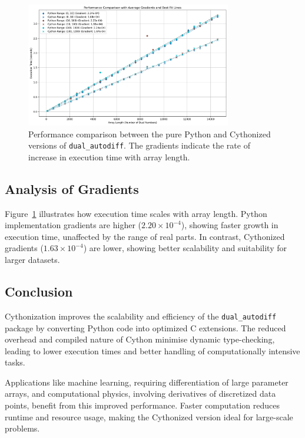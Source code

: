 \documentclass[a4paper,12pt]{article}
\begin{document}
\begin{figure}[h!]
    \centering
    \includegraphics[width=0.8\textwidth]{performance_comparison.png}
    \caption{Performance comparison between the pure Python and Cythonized versions of \texttt{dual\_autodiff}. The gradients indicate the rate of increase in execution time with array length.}
    \label{fig:performance_comparison}
\end{figure}

\subsection{Analysis of Gradients}
Figure~\ref{fig:performance_comparison} illustrates how execution time scales with array length. Python implementation gradients are higher (\(2.20 \times 10^{-4}\)), showing faster growth in execution time, unaffected by the range of real parts. In contrast, Cythonized gradients (\(1.63 \times 10^{-4}\)) are lower, showing better scalability and suitability for larger datasets.

\subsection{Conclusion}
Cythonization improves the scalability and efficiency of the \texttt{dual\_autodiff} package by converting Python code into optimized C extensions. The reduced overhead and compiled nature of Cython minimise dynamic type-checking, leading to lower execution times and better handling of computationally intensive tasks.

Applications like machine learning, requiring differentiation of large parameter arrays, and computational physics, involving derivatives of discretized data points, benefit from this improved performance. Faster computation reduces runtime and resource usage, making the Cythonized version ideal for large-scale problems.
\end{document}
